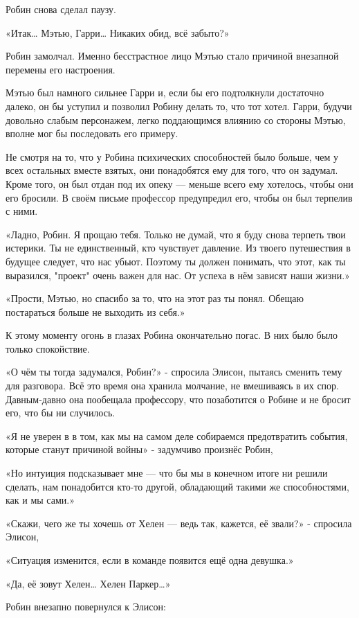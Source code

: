 \documentclass[a5paper, 9pt,
final, openany, twoside=true]{memoir}
\begin{document}
Робин снова сделал паузу.

«Итак… Мэтью, Гарри… Никаких обид, всё забыто?»\bigskip

Робин замолчал. Именно бесстрастное лицо Мэтью стало причиной внезапной перемены его настроения.

Мэтью был намного сильнее Гарри и, если бы его подтолкнули достаточно далеко, он бы уступил и позволил Робину делать то, что тот хотел. Гарри, будучи довольно слабым персонажем, легко поддающимся влиянию со стороны Мэтью, вполне мог бы последовать его примеру.

Не смотря на то, что у Робина психических способностей было больше, чем у всех остальных вместе взятых, они понадобятся ему для того, что он задумал. Кроме того, он был отдан под их опеку — меньше всего ему хотелось, чтобы они его бросили. В своём письме профессор предупредил его, чтобы он был терпелив с ними.

«Ладно, Робин. Я прощаю тебя. Только не думай, что я буду снова терпеть твои истерики. Ты не единственный, кто чувствует давление. Из твоего путешествия в будущее следует, что нас убьют. Поэтому ты должен понимать, что этот, как ты выразился, "проект" очень важен для нас. От успеха в нём зависят наши жизни.»

«Прости, Мэтью, но спасибо за то, что на этот раз ты понял. Обещаю постараться больше не выходить из себя.»

К этому моменту огонь в глазах Робина окончательно погас. В них было было только спокойствие.

«О чём ты тогда задумался, Робин?» - спросила Элисон, пытаясь сменить тему для разговора. Всё это время она хранила молчание, не вмешиваясь в их спор. Давным-давно она пообещала профессору, что позаботится о Робине и не бросит его, что бы ни случилось.

«Я не уверен в в том, как мы на самом деле собираемся предотвратить события, которые станут причиной войны» - задумчиво произнёс Робин,

«Но интуиция подсказывает мне — что бы мы в конечном итоге ни решили сделать, нам понадобится кто-то другой, обладающий такими же способностями, как и мы сами.»

«Скажи, чего же ты хочешь от Хелен — ведь так, кажется, её звали?» - спросила Элисон,

«Ситуация изменится, если в команде появится ещё одна девушка.»

«Да, её зовут Хелен…  Хелен Паркер…»

Робин внезапно повернулся к Элисон:
\end{document}
